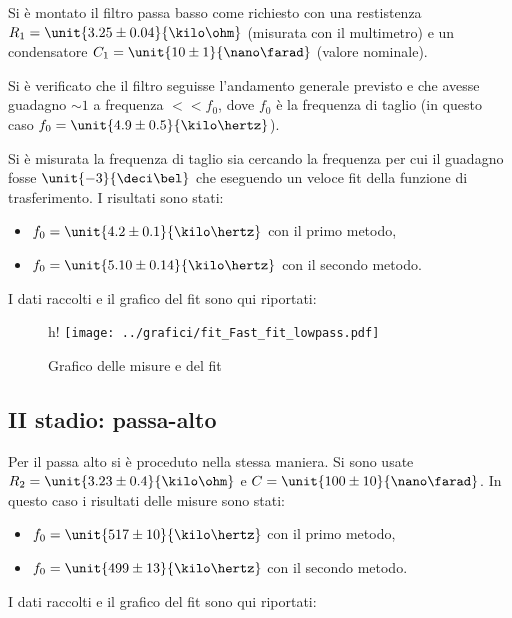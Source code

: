 \documentclass[10pt,a4paper]{article}
\begin{document}
Si è montato il filtro passa basso come richiesto con una restistenza $R_1 = \unit{3.25 \pm 0.04}{\kilo\ohm}$ (misurata con il multimetro) e un condensatore $C_1=\unit{10 \pm 1}{\nano\farad}$ (valore nominale).

Si è verificato che il filtro seguisse l'andamento generale previsto e che avesse guadagno $\sim 1$ a frequenza $<<f_0$, dove $f_0$ è la frequenza di taglio (in questo caso $f_0 = \unit{4.9 \pm 0.5}{\kilo\hertz}$).

Si è misurata la frequenza di taglio sia cercando la frequenza per cui il guadagno fosse $\unit{-3}{\deci\bel}$ che eseguendo un veloce fit della funzione di trasferimento.
I risultati sono stati:
\begin{itemize}
	\item $f_0 = \unit{4.2 \pm 0.1}{\kilo\hertz}$ con il primo metodo,
	\item $f_0 = \unit{5.10 \pm 0.14}{\kilo\hertz}$ con il secondo metodo.
\end{itemize}
I dati raccolti e il grafico del fit sono qui riportati:

\begin{figure}[h!]
	\centering
	
\end{figure}

\begin{figure}{h!}
	\centering
	\texttt{[image: ../grafici/fit\_Fast\_fit\_lowpass.pdf]}
	\caption{Grafico delle misure e del fit}
\end{figure}

\subsection{II stadio: passa-alto}
Per il passa alto si è proceduto nella stessa maniera. Si sono usate $R_2=\unit{3.23 \pm 0.4}{\kilo\ohm}$ e $C=\unit{100 \pm 10}{\nano\farad}$.
In questo caso i risultati delle misure sono stati:
\begin{itemize}
	\item $f_0 = \unit{517 \pm 10}{\kilo\hertz}$ con il primo metodo,
	\item $f_0 = \unit{499 \pm 13}{\kilo\hertz}$ con il secondo metodo.
\end{itemize}

I dati raccolti e il grafico del fit sono qui riportati:

\begin{figure}[h!]
	\centering
	
\end{figure}
	
\end{document}

